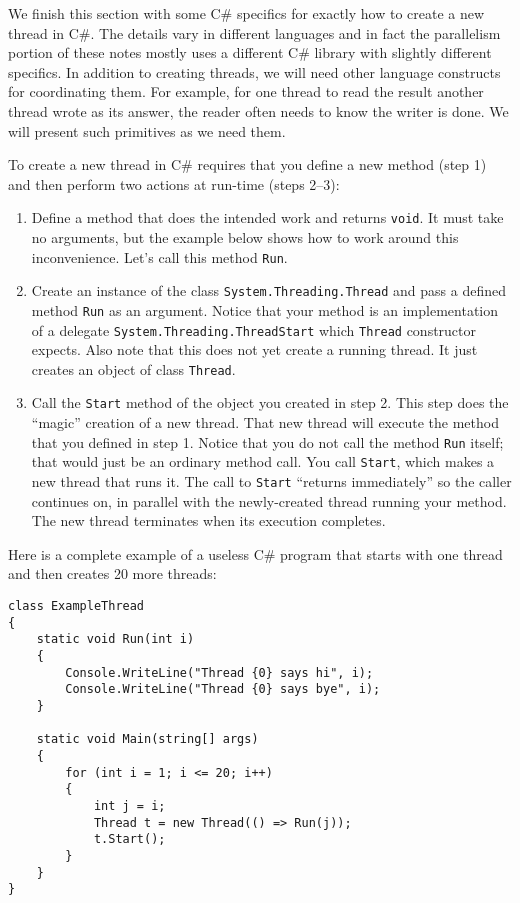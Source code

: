 \documentclass[10pt]{article}
\begin{document}
We finish this section with some C\# specifics for exactly how to
create a new thread in C\#.  The details vary in different languages
and in fact the parallelism portion of these notes mostly uses a
different C\# library with slightly different specifics.  In addition
to creating threads, we will need other language constructs for
coordinating them.  For example, for one thread to read the result
another thread wrote as its answer, the reader often needs to know the
writer is done.  We will present such primitives as we need them.

To create a new thread in C\# requires that you define a new method
(step 1) and then perform two actions at run-time (steps 2--3):
\begin{enumerate}
\item Define a method that does the intended work and returns
  {\tt void}. It must take no arguments, but the example below shows
  how to work around this inconvenience. Let's call this method {\tt Run}.
\item Create an instance of the class {\tt System.Threading.Thread} and
  pass a defined method {\tt Run} as an argument. Notice that your method
  is an implementation of a delegate {\tt System.Threading.ThreadStart}
  which {\tt Thread} constructor expects. Also note that this does not
  yet create a running thread. It just creates an object of class {\tt Thread}. 
\item Call the {\tt Start} method of the object you created in step 2. This
  step does the “magic” creation of a new thread. That new thread will
  execute the method that you defined in step 1. Notice that you do not
  call the method {\tt Run} itself; that would just be an ordinary method
  call. You call {\tt Start}, which makes a new thread that runs it.
  The call to {\tt Start} “returns immediately” so the caller continues
  on, in parallel with the newly-created thread running your method.
  The new thread terminates when its execution completes.
\end{enumerate}
Here is a complete example of a useless C\# program that starts with one
thread and then creates 20 more threads:
\begin{verbatim}
class ExampleThread
{
    static void Run(int i)
    {
        Console.WriteLine("Thread {0} says hi", i);
        Console.WriteLine("Thread {0} says bye", i);
    }

    static void Main(string[] args)
    {
        for (int i = 1; i <= 20; i++)
        {
            int j = i;
            Thread t = new Thread(() => Run(j));
            t.Start();
        }
    }
}
\end{verbatim}
\end{document}
